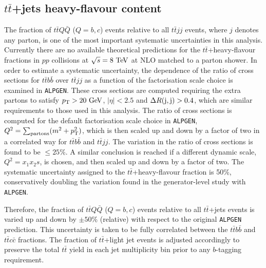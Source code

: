 
\subsection{$t\bar{t}$+jets heavy-flavour content}
\label{sec:syst_ttbarHF}
The fraction of $t\bar{t}Q\bar{Q}$ ($Q=b,c$) events relative to all $t\bar{t}jj$ events, where $j$ denotes any parton,
is one of the most important systematic uncertainties in this analysis. 
Currently there are no available theoretical predictions for the $t\bar{t}$+heavy-flavour fractions in $pp$ collisions at $\sqrt{s}=8\tev$ at NLO matched to a parton shower.
In order to estimate a systematic uncertainty, the dependence of the ratio of cross sections for $t\bar{t}b\bar{b}$ over
$t\bar{t}jj$ as a function of the factorisation scale choice is examined in \texttt{ALPGEN}. These cross
sections are computed requiring the extra partons to satisfy $\pt>20\gev$, $|\eta|<2.5$ and $\Delta R({\rm j},{\rm j})>0.4$, which are similar requirements
to those used in this analysis. The ratio of cross sections is computed for the default factorisation scale choice
in \texttt{ALPGEN}, $Q^2=\sum_{\rm partons} (m^2 + \pt^2)$, which is then scaled up and down by a factor of two
in a correlated way for $t\bar{t}b\bar{b}$ and $t\bar{t}jj$.
The variation in the ratio of cross sections is found to be $\leq 25\%$. A similar conclusion is reached if a
different dynamic scale,  $Q^2=x_1 x_2 s$, is chosen, and then scaled up and down by a factor of two.
The systematic uncertainty assigned to the $t\bar{t}$+heavy-flavour fraction is 50\%, conservatively doubling
the variation found in the generator-level study with \texttt{ALPGEN}. 

Therefore, the fraction of $t\bar{t}Q\bar{Q}$ ($Q=b,c$) events relative to all $t\bar{t}$+jets events
is varied up and down by $\pm 50\%$ (relative) with respect to the original \texttt{ALPGEN} prediction. 
This uncertainty is taken to be fully correlated between the $t\bar{t}b\bar{b}$ and $t\bar{t}c\bar{c}$ fractions.
The fraction of $t\bar{t}$+light jet events is adjusted accordingly to preserve the total $t\bar{t}$ yield in each jet multiplicity bin 
prior to any $b$-tagging requirement.


